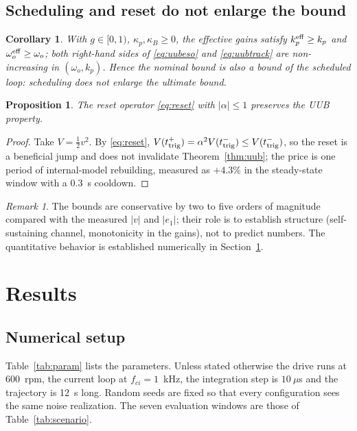 \documentclass[journal]{IEEEtran}
\newtheorem{proposition}{Proposition}
\newtheorem{corollary}{Corollary}
\theoremstyle{remark}
\newtheorem{remark}{Remark}
\begin{document}
\subsection{Scheduling and reset do not enlarge the bound}
\begin{corollary}\label{cor:schedule}
With $g\in[0,1)$, $\kappa_p,\kappa_B\ge0$, the effective gains satisfy
$k_p^{\rm eff}\ge k_p$ and $\omega_o^{\rm eff}\ge\omega_o$; both right-hand sides of
\eqref{eq:uubeso} and \eqref{eq:uubtrack} are non-increasing in
$(\omega_o,k_p)$. Hence the nominal bound is also a bound of the scheduled loop:
scheduling does not enlarge the ultimate bound.
\end{corollary}
\begin{proposition}\label{prop:reset}
The reset operator \eqref{eq:reset} with $|\alpha|\le1$ preserves the UUB property.
\end{proposition}
\begin{proof}
Take $V=\tfrac12 v^2$. By \eqref{eq:reset}, $V(t_{\rm trig}^+)=\alpha^2V(t_{\rm trig}^-)
\le V(t_{\rm trig}^-)$, so the reset is a beneficial jump and does not invalidate
Theorem~\ref{thm:uub}; the price is one period of internal-model rebuilding, measured
as $+4.3\%$ in the steady-state window with a $0.3$~s cooldown.
\end{proof}

\begin{remark}
The bounds are conservative by two to five orders of magnitude compared with the
measured $|v|$ and $|e_1|$; their role is to establish structure (self-sustaining
channel, monotonicity in the gains), not to predict numbers. The quantitative behavior
is established numerically in Section~\ref{sec:results}.
\end{remark}

\section{Results}\label{sec:results}

\subsection{Numerical setup}
Table~\ref{tab:param} lists the parameters. Unless stated otherwise the drive runs at
600~rpm, the current loop at $f_{ci}=1$~kHz, the integration step is $10~\mu$s and the
trajectory is 12~s long. Random seeds are fixed so that every configuration sees the
same noise realization. The seven evaluation windows are those of
Table~\ref{tab:scenario}.
\end{document}
